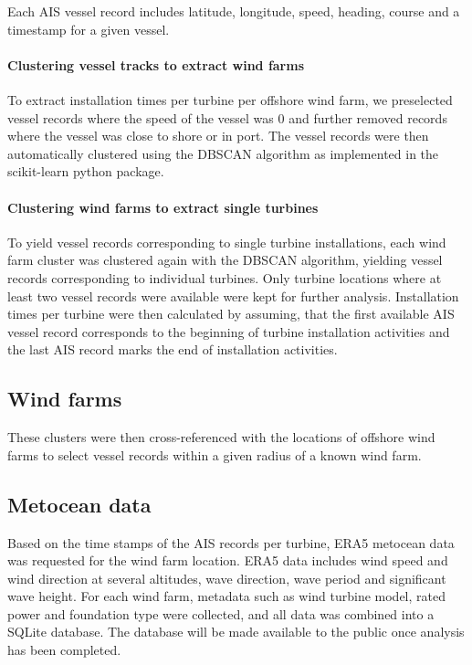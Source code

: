 \documentclass[wes, manuscript]{copernicus}
\begin{document}
Each AIS vessel record includes latitude, longitude, speed, heading, course and a 
timestamp for a given vessel.

\paragraph{Clustering vessel tracks to extract wind farms}
To extract installation times per turbine per offshore 
wind farm, we preselected vessel records where the speed of the vessel was 0 and further 
removed records where the vessel was close to shore or in port. The vessel records were 
then automatically clustered using the DBSCAN algorithm as implemented in the 
scikit-learn python package. 
\paragraph{Clustering wind farms to extract single turbines}
To yield vessel records corresponding to single turbine installations, 
each wind farm cluster was clustered again with the DBSCAN algorithm, yielding vessel 
records corresponding to individual turbines. Only turbine locations where at least two 
vessel records were available were kept for further analysis.
Installation times per turbine were then calculated by assuming, that the first available 
AIS vessel record corresponds to the beginning of turbine installation activities and the 
last AIS record marks the end of installation activities.

\subsection{Wind farms}
These clusters were then cross-referenced with the 
locations of offshore wind farms to select vessel records within a given radius of a 
known wind farm. 

\subsection{Metocean data}
Based on the time stamps of the AIS records per turbine, ERA5 metocean data was 
requested for the wind farm location. ERA5 data includes wind speed and wind direction at several 
altitudes, wave direction, wave period and significant wave height. For each wind farm, 
metadata such as wind turbine model, rated power and foundation type were collected, 
and all data was combined into a SQLite database. The database will be made available 
to the public once analysis has been completed. 
\end{document}
